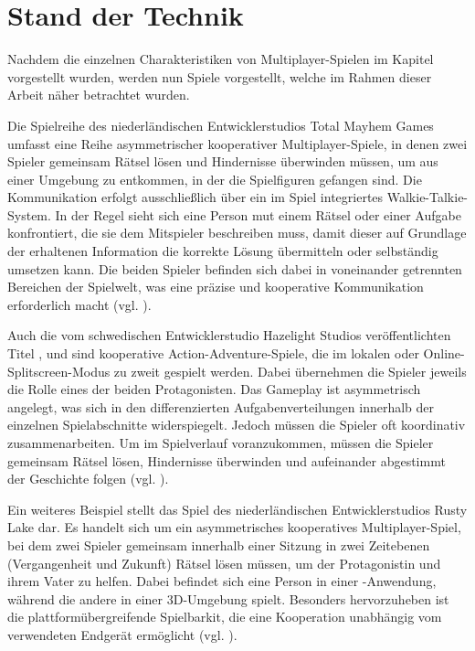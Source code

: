 \chapter{Stand der Technik} \label{sec:sota}
Nachdem die einzelnen Charakteristiken von Multiplayer-Spielen im Kapitel \emph{} vorgestellt wurden, werden nun Spiele vorgestellt, welche im Rahmen dieser Arbeit näher betrachtet wurden.

Die Spielreihe  des niederländischen Entwicklerstudios Total Mayhem Games umfasst eine Reihe asymmetrischer kooperativer Multiplayer-Spiele, in denen zwei Spieler gemeinsam Rätsel lösen und Hindernisse überwinden müssen, um aus einer Umgebung zu entkommen, in der die Spielfiguren gefangen sind. Die Kommunikation erfolgt ausschließlich über ein im Spiel integriertes Walkie-Talkie-System. In der Regel sieht sich eine Person mut einem Rätsel oder einer Aufgabe konfrontiert, die sie dem Mitspieler beschreiben muss, damit dieser auf Grundlage der erhaltenen Information die korrekte Lösung übermitteln oder selbständig umsetzen kann. Die beiden Spieler befinden sich dabei in voneinander getrennten Bereichen der Spielwelt, was eine präzise und kooperative Kommunikation erforderlich macht (vgl. \citealp{total_mayhem_games_we_2017,total_mayhem_games_we_2018}).  

Auch die vom schwedischen Entwicklerstudio Hazelight Studios veröffentlichten Titel ,  und   sind kooperative Action-Adventure-Spiele, die im lokalen oder Online-Splitscreen-Modus zu zweit gespielt werden. Dabei übernehmen die Spieler jeweils die Rolle eines der beiden Protagonisten. Das Gameplay ist asymmetrisch angelegt, was sich in den differenzierten Aufgabenverteilungen innerhalb der einzelnen Spielabschnitte widerspiegelt. Jedoch müssen die Spieler oft koordinativ zusammenarbeiten. Um im Spielverlauf voranzukommen, müssen die Spieler gemeinsam Rätsel lösen, Hindernisse überwinden und aufeinander abgestimmt der Geschichte folgen (vgl. \citealp{hazelight_studios_way_2018,hazelight_studios_it_2021,hazelight_studios_split_2025}).

Ein weiteres Beispiel stellt das Spiel  des niederländischen Entwicklerstudios Rusty Lake dar. Es handelt sich um ein asymmetrisches kooperatives Multiplayer-Spiel, bei dem zwei Spieler gemeinsam innerhalb einer Sitzung in zwei Zeitebenen (Vergangenheit und Zukunft) Rätsel lösen müssen, um der Protagonistin und ihrem Vater zu helfen. Dabei befindet sich eine Person in einer -Anwendung, während die andere in einer \ac{3D}-Umgebung spielt. Besonders hervorzuheben ist die plattformübergreifende Spielbarkit, die eine Kooperation unabhängig vom verwendeten Endgerät ermöglicht (vgl. \citealp{rusty_lake_past_2022}). 

